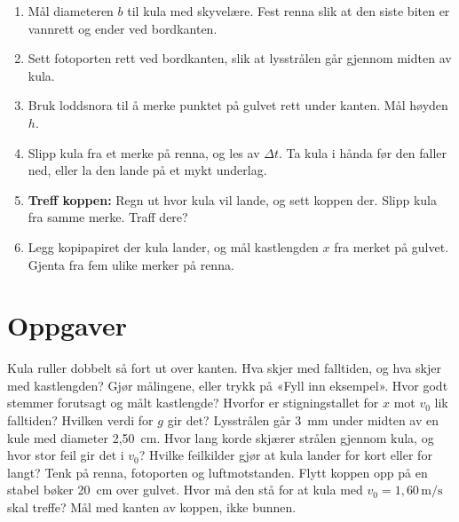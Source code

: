 \documentclass[11pt]{article}
\begin{document}
\begin{enumerate}
\item Mål diameteren $b$ til kula med skyvelære. Fest renna slik at den siste biten er vannrett og ender ved bordkanten.
\item Sett fotoporten rett ved bordkanten, slik at lysstrålen går gjennom midten av kula.
\item Bruk loddsnora til å merke punktet på gulvet rett under kanten. Mål høyden $h$.
\item Slipp kula fra et merke på renna, og les av $Δt$. Ta kula i hånda før den faller ned, eller la den lande på et mykt underlag.
\item \textbf{Treff koppen:} Regn ut hvor kula vil lande, og sett koppen der. Slipp kula fra samme merke. Traff dere?
\item Legg kopipapiret der kula lander, og mål kastlengden $x$ fra merket på gulvet. Gjenta fra fem ulike merker på renna.
\end{enumerate}

\section*{Oppgaver}

\begin{oppgaveliste}
\oppgave {}Kula ruller dobbelt så fort ut over kanten. Hva skjer med falltiden, og hva skjer med kastlengden?
\svar
\oppgave {}Gjør målingene, eller trykk på «Fyll inn eksempel». Hvor godt stemmer forutsagt og målt kastlengde?
\svar
\oppgave {}Hvorfor er stigningstallet for $x$ mot $v_{0}$ lik falltiden? Hvilken verdi for $g$ gir det?
\svar
\oppgave {}Lysstrålen går 3~mm under midten av en kule med diameter 2,50~cm. Hvor lang korde skjærer strålen gjennom kula, og hvor stor feil gir det i $v_{0}$?
\svar
\oppgave {}Hvilke feilkilder gjør at kula lander for kort eller for langt? Tenk på renna, fotoporten og luftmotstanden.
\svar
\oppgave {}Flytt koppen opp på en stabel bøker 20~cm over gulvet. Hvor må den stå for at kula med $v_{0} = 1{,}60\,\mathrm{m/s}$ skal treffe? Mål med kanten av koppen, ikke bunnen.
\svar
\end{oppgaveliste}
\end{document}
